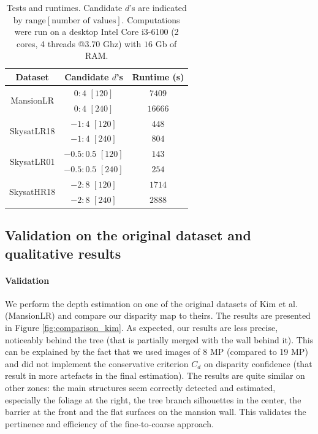 \documentclass{article}
\theoremstyle{definition}
\begin{document}
\begin{table}[ht]
\centering
  \begin{tabular}{|c|c|c|}
   \hline
  \textbf{Dataset} & \textbf{Candidate $d$'s} & \textbf{Runtime (s)}\\
  \hline \hline 
  \multirow{2}{*}{MansionLR} & $0:4$ $[120]$ & $7409$\\
  & $0:4$ $[240]$ & $16666$\\
  \hline 
  \multirow{2}{*}{SkysatLR18} & $-1:4$ $[120]$ & $448$\\
  & $-1:4$ $[240]$ & $804$\\
  \hline 
  \multirow{2}{*}{SkysatLR01} & $-0.5:0.5$ $[120]$ & $143$\\
  & $-0.5:0.5$ $[240]$ & $254$\\
  \hline 
  \multirow{2}{*}{SkysatHR18} & $-2:8$ $[120]$ & $1714$\\
  & $-2:8$ $[240]$ & $2888$\\
  \hline
  \end{tabular}

 \caption{Tests and runtimes. Candidate $d$'s are indicated by $\mathrm{range}[\text{number of values}]$. Computations were run on a desktop Intel Core i3-6100 (2 cores, 4 threads @3.70 Ghz) with $16$ Gb of RAM.}
 \label{table:tests}
\end{table}


\subsection{Validation on the original dataset and qualitative results}


\paragraph{Validation} We perform the depth estimation on one of the original datasets of Kim et al. (MansionLR) and compare our disparity map to theirs. The results are presented in Figure \ref{fig:comparison_kim}. As expected, our results are less precise, noticeably behind the tree (that is partially merged with the wall behind it). This can be explained by the fact that we used images of 8 MP (compared to 19 MP) and did not implement the conservative criterion $C_d$ on disparity confidence (that result in more artefacts in the final estimation). The results are quite similar on other zones: the main structures seem correctly detected and estimated, especially the foliage at the right, the tree branch silhouettes in the center, the barrier at the front and the flat surfaces on the mansion wall. This validates the pertinence and efficiency of the fine-to-coarse approach.
\end{document}
